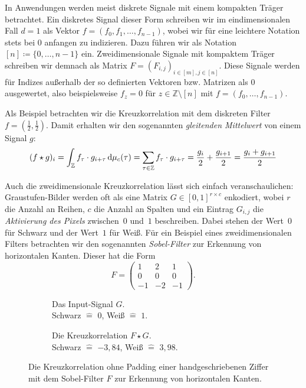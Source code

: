 \documentclass[paper=a4, 	%
		fontsize=11pt,
		abstract=true, 	%
		headsepline, 	%
		notitlepage	%
		]{scrartcl}
\theoremstyle{definition}
\newcommand{\Z}{\mathbb{Z}}
\newcommand{\diff}{\,\textrm{d}}
\newcommand{\fNat}[1]{[ #1 ]}
\begin{document}
In Anwendungen werden meist diskrete Signale mit einem kompakten Träger betrachtet.
Ein diskretes Signal dieser Form schreiben wir im eindimensionalen Fall $d=1$ als Vektor $f = (f_0, f_1, \dots, f_{n-1})$, wobei wir für eine leichtere Notation stets bei $0$ anfangen zu indizieren.
Dazu führen wir als Notation $\fNat{n}\coloneqq \{0, \dots, n-1\}$ ein. 
Zweidimensionale Signale mit kompaktem Träger schreiben wir demnach als Matrix $F = (F_{i,j})_{i\in\fNat{m}, j\in\fNat{n}}$.
Diese Signale werden für Indizes außerhalb der so definierten Vektoren bzw. Matrizen als $0$ ausgewertet, also beispielsweise $f_z = 0$ für $z\in\Z\setminus\fNat{n}$ mit $f=(f_0, \dots, f_{n-1})$.

Als Beispiel betrachten wir die Kreuzkorrelation mit dem diskreten Filter $f=(\frac{1}{2}, \frac{1}{2})$.
Damit erhalten wir den sogenannten \emph{gleitenden Mittelwert} von einem Signal $g$:
\[  
    (f \star g)_i = \int_\Z f_\tau \cdot g_{i + \tau} \diff \cmeasure(\tau) 
    = \sum_{\tau\in\Z} f_\tau \cdot g_{i+ \tau}
    = \frac{g_i}{2} + \frac{g_{i+1}}{2} = \frac{g_i + g_{i+1}}{2}
\]

Auch die zweidimensionale Kreuzkorrelation lässt sich einfach veranschaulichen:
Grau\-stufen-Bilder werden oft als eine Matrix $G\in[0,1]^{r\times c}$ enkodiert, wobei $r$ die Anzahl an Reihen, $c$ die Anzahl an Spalten und ein Eintrag $G_{i,j}$ die \emph{Aktivierung des Pixels} zwischen~$0$ und~$1$ beschreiben.
Dabei stehen der Wert~$0$ für Schwarz und der Wert~$1$ für Weiß.
Für ein Beispiel eines zweidimensionalen Filters betrachten wir den sogenannten \emph{Sobel-Filter} zur Erkennung von horizontalen Kanten.
Dieser hat die Form
\[
    F = \begin{pmatrix}
        1 & 2 & 1 \\
        0 & 0 & 0 \\ 
        -1 & -2 & -1
    \end{pmatrix}.
\]


\begin{figure}
    \centering
    \begin{subfigure}{0.4\textwidth}
        \resizebox{\textwidth}{\textwidth}{
        
        }
        \caption{Das Input-Signal $G$.\\Schwarz $\hat=$ $0$, Weiß $\hat=$ $1$.}
    \end{subfigure}%
    \begin{subfigure}{0.4\textwidth}
        \resizebox{0.9285\textwidth}{0.9285\textwidth}{
        
        }
    \caption{Die Kreuzkorrelation $F\star G$.\\Schwarz $\hat=$ $-3{,}84$, Weiß $\hat=$ $3{,}98$.}
    \end{subfigure}
    \caption{Die Kreuzkorrelation ohne Padding einer handgeschriebenen Ziffer mit dem Sobel-Filter $F$ zur Erkennung von horizontalen Kanten.}
    \label{fig:sobel-on-mnist}
\end{figure}
\end{document}
